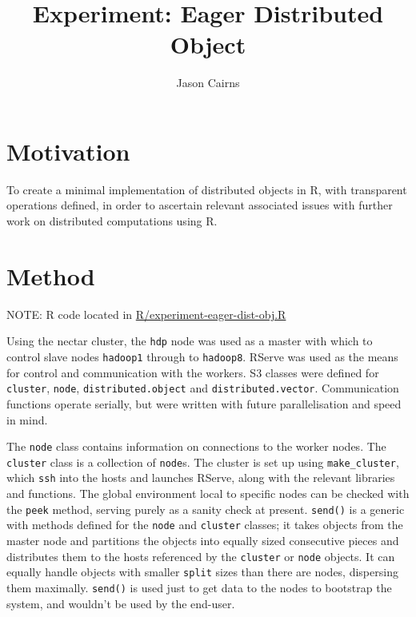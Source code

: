 \documentclass[a4paper,10pt]{article}
\begin{document}
\title{Experiment: Eager Distributed Object}
\author{Jason Cairns}
  
\maketitle

\section{Motivation}

To create a minimal implementation of distributed objects in R, with
transparent operations defined, in order to ascertain relevant associated
issues with further work on distributed computations using R.

\section{Method}

NOTE: R code located in
\href{../R/experiment-eager-dist-obj.R}{R/experiment-eager-dist-obj.R}

Using the nectar cluster, the \texttt{hdp} node was used as a master with which
to control slave nodes \texttt{hadoop1} through to \texttt{hadoop8}.
RServe was used as the means for control and communication with the workers.
S3 classes were defined for \texttt{cluster}, \texttt{node},
\texttt{distributed.object} and \texttt{distributed.vector}. 
Communication functions operate serially, but were written with future
parallelisation and speed in mind.

The \texttt{node} class contains information on connections to the worker nodes.
The \texttt{cluster} class is a collection of \texttt{node}s.
The cluster is set up using \texttt{make\_cluster}, which \texttt{ssh} into the
hosts and launches RServe, along with the relevant libraries and functions.
The global environment local to specific nodes can be checked with the
\texttt{peek} method, serving purely as a sanity check at present.
\texttt{send()} is a generic with methods defined for the \texttt{node} and
\texttt{cluster} classes;
it takes objects from the master node and partitions the objects into equally
sized consecutive pieces and distributes them to the hosts referenced by the
\texttt{cluster} or \texttt{node} objects.
It can equally handle objects with smaller \texttt{split} sizes than there are
nodes, dispersing them maximally.
\texttt{send()} is used just to get data to the nodes to bootstrap the system,
and wouldn't be used by the end-user.
\end{document}
